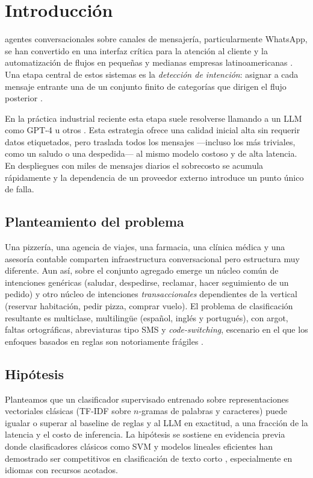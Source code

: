 \documentclass[journal]{IEEEtran}
\begin{document}
\section{Introducci\'on}
 agentes conversacionales sobre canales de mensajer\'ia,
particularmente WhatsApp, se han convertido en una interfaz cr\'itica para la
atenci\'on al cliente y la automatizaci\'on de flujos en peque\~nas y medianas
empresas latinoamericanas \cite{chen2017survey,tur2011slu}. Una etapa central
de estos sistemas es la \emph{detecci\'on de intenci\'on}: asignar a cada
mensaje entrante una de un conjunto finito de categor\'ias que dirigen el flujo
posterior \cite{larson2019clinc,coucke2018snips}.

En la pr\'actica industrial reciente esta etapa suele resolverse llamando a un
LLM como GPT-4 u otros \cite{brown2020gpt3}. Esta estrategia ofrece una calidad
inicial alta sin requerir datos etiquetados, pero traslada todos los mensajes
---incluso los m\'as triviales, como un saludo o una despedida--- al mismo
modelo costoso y de alta latencia. En despliegues con miles de mensajes diarios
el sobrecosto se acumula r\'apidamente y la dependencia de un proveedor externo
introduce un punto \'unico de falla.

\subsection{Planteamiento del problema}
Una pizzer\'ia, una agencia de viajes, una farmacia, una cl\'inica m\'edica y una
asesor\'ia contable comparten infraestructura conversacional pero estructura muy
diferente. Aun as\'i, sobre el conjunto agregado emerge un n\'ucleo com\'un de
intenciones gen\'ericas (saludar, despedirse, reclamar, hacer seguimiento de un
pedido) y otro n\'ucleo de intenciones \emph{transaccionales} dependientes de la
vertical (reservar habitaci\'on, pedir pizza, comprar vuelo). El problema de
clasificaci\'on resultante es multiclase, multiling\"ue (espa\~nol, ingl\'es y
portugu\'es), con argot, faltas ortogr\'aficas, abreviaturas tipo SMS y
\emph{code-switching}, escenario en el que los enfoques basados en reglas son
notoriamente fr\'agiles \cite{pang2008opinion}.

\subsection{Hip\'otesis}
Planteamos que un clasificador supervisado entrenado sobre representaciones
vectoriales cl\'asicas (TF-IDF sobre $n$-gramas de palabras y caracteres) puede
igualar o superar al baseline de reglas y al LLM en exactitud, a una fracci\'on
de la latencia y el costo de inferencia. La hip\'otesis se sostiene en
evidencia previa donde clasificadores cl\'asicos como SVM \cite{joachims1998svmtext}
y modelos lineales eficientes \cite{joulin2017fasttext} han demostrado ser
competitivos en clasificaci\'on de texto corto \cite{liu2019benchmarking},
especialmente en idiomas con recursos acotados.
\end{document}
